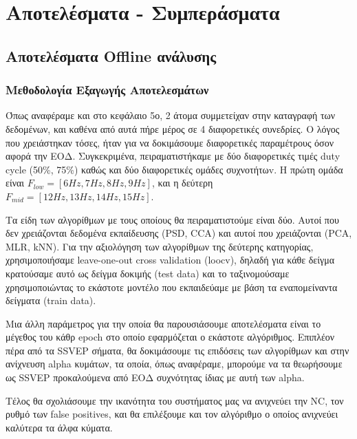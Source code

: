 \documentclass[11pt,a4paper,english,greek,twoside]{../Thesis}
\begin{document}
\chapter{Αποτελέσματα - Συμπεράσματα} \label{chap:Results}

\section{Αποτελέσματα Offline ανάλυσης}

\subsection{Μεθοδολογία Εξαγωγής Αποτελεσμάτων}

\par Όπως αναφέραμε και στο κεφάλαιο 5ο, 2 άτομα συμμετείχαν στην καταγραφή των δεδομένων, και καθένα από αυτά πήρε μέρος σε 4 διαφορετικές συνεδρίες. Ο λόγος που χρειάστηκαν τόσες, ήταν για να δοκιμάσουμε διαφορετικές παραμέτρους όσον αφορά την ΕΟΔ. Συγκεκριμένα, πειραματιστήκαμε με δύο διαφορετικές τιμές duty cycle (50\%, 75\%) καθώς και δύο διαφορετικές ομάδες συχνοτήτωv. Η πρώτη ομάδα είναι $F_{low} = [6Hz,7Hz,8Hz,9Hz]$, και η δεύτερη $F_{mid} = [12Hz,13Hz,14Hz,15Hz]$.

\par Τα είδη των αλγορίθμων με τους οποίους θα πειραματιστούμε είναι δύο. Αυτοί που δεν χρειάζονται δεδομένα εκπαίδευσης (PSD, CCA) και αυτοί που χρειάζονται (PCA, MLR, kNN). Για την αξιολόγηση των αλγορίθμων της δεύτερης κατηγορίας, χρησιμοποιήσαμε leave-one-out cross validation (loocv), δηλαδή για κάθε δείγμα κρατούσαμε αυτό ως δείγμα δοκιμής (test data) και το ταξινομούσαμε χρησιμοποιώντας το εκάστοτε μοντέλο που εκπαιδεύαμε με βάση τα εναπομείναντα δείγματα (train data).

\par Μια άλλη παράμετρος για την οποία θα παρουσιάσουμε αποτελέσματα είναι το μέγεθος του κάθρ epoch στο οποίο εφαρμόζεται ο εκάστοτε αλγόριθμος. Επιπλέον πέρα από τα SSVEP σήματα, θα δοκιμάσουμε τις επιδόσεις των αλγορίθμων και στην ανίχνευση alpha κυμάτων, τα οποία, όπως αναφέραμε, μπορούμε να τα θεωρήσουμε ως SSVEP προκαλούμενα από ΕΟΔ συχνότητας ίδιας με αυτή των alpha.

\par Τέλος θα σχολιάσουμε την ικανότητα του συστήματος μας να ανιχνεύει την NC, τον ρυθμό των false positives, και θα επιλέξουμε και τον αλγόριθμο ο οποίος ανιχνεύει καλύτερα τα άλφα κύματα. 
\end{document}
